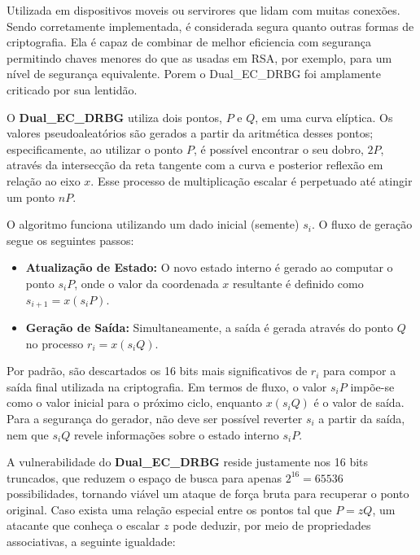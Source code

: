         Utilizada em dispositivos moveis ou servirores que lidam com muitas conexões. Sendo corretamente implementada, é considerada segura quanto outras formas de criptografia.
        Ela é capaz de combinar de melhor eficiencia com segurança permitindo chaves menores do que as usadas em RSA, por exemplo, para um nível de segurança equivalente.
        Porem o Dual\_EC\_DRBG foi amplamente criticado por sua lentidão.

        O \textbf{Dual\_EC\_DRBG} utiliza dois pontos, $P$ e $Q$, em uma curva elíptica. 
        Os valores pseudoaleatórios são gerados a partir da aritmética desses pontos; especificamente, ao utilizar o ponto $P$, é possível encontrar o seu dobro, $2P$, 
        através da intersecção da reta tangente com a curva e posterior reflexão em relação ao eixo $x$. Esse processo de multiplicação escalar é perpetuado até atingir um ponto $nP$.

        O algoritmo funciona utilizando um dado inicial (semente) $s_i$. O fluxo de geração segue os seguintes passos:
        
        \begin{itemize}
            \item \textbf{Atualização de Estado:} O novo estado interno é gerado ao computar o ponto $s_i P$, onde o valor da coordenada $x$ resultante é definido como $s_{i+1} = x(s_i P)$.
            \item \textbf{Geração de Saída:} Simultaneamente, a saída é gerada através do ponto $Q$ no processo $r_i = x(s_i Q)$. 
        \end{itemize}
        
        Por padrão, são descartados os 16 bits mais significativos de $r_i$ para compor a saída final utilizada na criptografia. Em termos de fluxo, o valor $s_i P$ impõe-se como o valor inicial para o próximo ciclo, 
        enquanto $x(s_i Q)$ é o valor de saída. Para a segurança do gerador, não deve ser possível reverter $s_i$ a partir da saída, nem que $s_i Q$ revele informações sobre o estado interno $s_i P$.
        
        A vulnerabilidade do \textbf{Dual\_EC\_DRBG} reside justamente nos 16 bits truncados, que reduzem o espaço de busca para apenas $2^{16} = 65536$ possibilidades, 
        tornando viável um ataque de força bruta para recuperar o ponto original. Caso exista uma relação especial entre os pontos tal que $P = zQ$, um atacante que conheça o escalar $z$ pode deduzir, 
        por meio de propriedades associativas, a seguinte igualdade:
        
